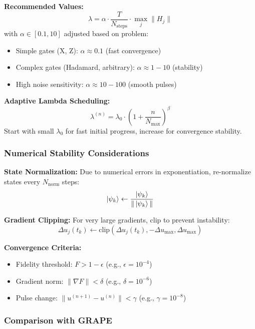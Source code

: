 \documentclass[11pt,a4paper]{article}
\theoremstyle{definition}
\theoremstyle{remark}
\begin{document}
\textbf{Recommended Values:}
\begin{equation}
\lambda = \alpha \cdot \frac{T}{N_{\text{steps}}} \cdot \max_j\|H_j\|
\end{equation}
with $\alpha \in [0.1, 10]$ adjusted based on problem:
\begin{itemize}
    \item Simple gates (X, Z): $\alpha \approx 0.1$ (fast convergence)
    \item Complex gates (Hadamard, arbitrary): $\alpha \approx 1-10$ (stability)
    \item High noise sensitivity: $\alpha \approx 10-100$ (smooth pulses)
\end{itemize}

\textbf{Adaptive Lambda Scheduling:}
\begin{equation}
\lambda^{(n)} = \lambda_0 \cdot \left(1 + \frac{n}{N_{\text{max}}}\right)^\beta
\end{equation}
Start with small $\lambda_0$ for fast initial progress, increase for convergence stability.

\subsubsection{Numerical Stability Considerations}

\textbf{State Normalization:}
Due to numerical errors in exponentiation, re-normalize states every $N_{\text{norm}}$ steps:
\begin{equation}
\ket{\psi_k} \leftarrow \frac{\ket{\psi_k}}{\|\ket{\psi_k}\|}
\end{equation}

\textbf{Gradient Clipping:}
For very large gradients, clip to prevent instability:
\begin{equation}
\Delta u_j(t_k) \leftarrow \text{clip}\left(\Delta u_j(t_k), -\Delta u_{\max}, \Delta u_{\max}\right)
\end{equation}

\textbf{Convergence Criteria:}
\begin{itemize}
    \item Fidelity threshold: $F > 1 - \epsilon$ (e.g., $\epsilon = 10^{-4}$)
    \item Gradient norm: $\|\nabla F\| < \delta$ (e.g., $\delta = 10^{-6}$)
    \item Pulse change: $\|u^{(n+1)} - u^{(n)}\| < \gamma$ (e.g., $\gamma = 10^{-8}$)
\end{itemize}

\subsubsection{Comparison with GRAPE}
\end{document}
